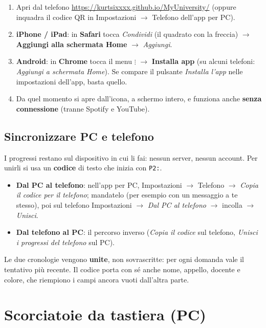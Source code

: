 \begin{passopasso}[: installarla]
\begin{enumerate}
  \item Apri dal telefono \url{https://kurtsixxxx.github.io/MyUniversity/} (oppure
        inquadra il codice QR in Impostazioni $\to$ Telefono dell'app per PC).
  \item \textbf{iPhone / iPad}: in \textbf{Safari} tocca \emph{Condividi} (il quadrato
        con la freccia) $\to$ \textbf{Aggiungi alla schermata Home} $\to$ \emph{Aggiungi}.
  \item \textbf{Android}: in \textbf{Chrome} tocca il menu \emph{$\vdots$} $\to$
        \textbf{Installa app} (su alcuni telefoni: \emph{Aggiungi a schermata Home}).
        Se compare il pulsante \emph{Installa l'app} nelle impostazioni dell'app, basta
        quello.
  \item Da quel momento si apre dall'icona, a schermo intero, e funziona anche
        \textbf{senza connessione} (tranne Spotify e YouTube).
\end{enumerate}
\end{passopasso}

\subsection*{Sincronizzare PC e telefono}

I progressi restano sul dispositivo in cui li fai: nessun server, nessun account. Per
unirli si usa un \textbf{codice} di testo che inizia con \texttt{P2:}.
\begin{itemize}
  \item \textbf{Dal PC al telefono}: nell'app per PC, Impostazioni $\to$ Telefono $\to$
        \emph{Copia il codice per il telefono}; mandatelo (per esempio con un messaggio a
        te stesso), poi sul telefono Impostazioni $\to$ \emph{Dal PC al telefono} $\to$
        incolla $\to$ \emph{Unisci}.
  \item \textbf{Dal telefono al PC}: il percorso inverso (\emph{Copia il codice} sul
        telefono, \emph{Unisci i progressi del telefono} sul PC).
\end{itemize}
Le due cronologie vengono \textbf{unite}, non sovrascritte: per ogni domanda vale il
tentativo più recente. Il codice porta con sé anche nome, appello, docente e colore, che
riempiono i campi ancora vuoti dall'altra parte.

\section*{Scorciatoie da tastiera (PC)}

